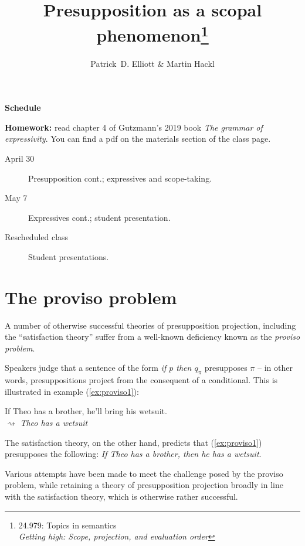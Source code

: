 \documentclass[nols,twoside,nofonts,nobib,nohyper]{tufte-handout}
\title{Presupposition as a scopal phenomenon\thanks{24.979: Topics in
    semantics\\\noindent\textit{Getting high: Scope, projection, and evaluation order}}}
\author[Patrick D. Elliott and Martin Hackl]{Patrick~D. Elliott \& Martin Hackl}
\begin{document}
\maketitle%

\begin{tcolorbox}
\textbf{Schedule}
\tcblower

\textbf{Homework:} read chapter 4 of Gutzmann's 2019 book \textit{The grammar of expressivity}. You can find a pdf on the materials section of the class page.

\begin{description}

    \item[April 30] Presupposition cont.; expressives and scope-taking.

    \item[May 7] Expressives cont.; student presentation.

    \item[Rescheduled class] Student presentations.

\end{description}

\end{tcolorbox}

\section{The proviso problem}

A number of otherwise successful theories of presupposition projection, including the \enquote{satisfaction theory} suffer from a well-known deficiency known as the \textit{proviso problem}.

Speakers judge that a sentence of the form \textit{if $p$ then $q_{\pi}$} presupposes $\pi$ -- in other words, presuppositions project from the consequent of a conditional. This is illustrated in example (\ref{ex:proviso1}):

\ex
If Theo has a brother, he'll bring his wetsuit.\label{ex:proviso1}\\
$⇝$ \textit{Theo has a wetsuit}
\xe

The satisfaction theory, on the other hand, predicts that (\ref{ex:proviso1}) presupposes the following: \textit{If Theo has a brother, then he has a wetsuit}.

Various attempts have been made to meet the challenge posed by the proviso problem, while retaining a theory of presupposition projection broadly in line with the satisfaction theory, which is otherwise rather successful.
\end{document}
